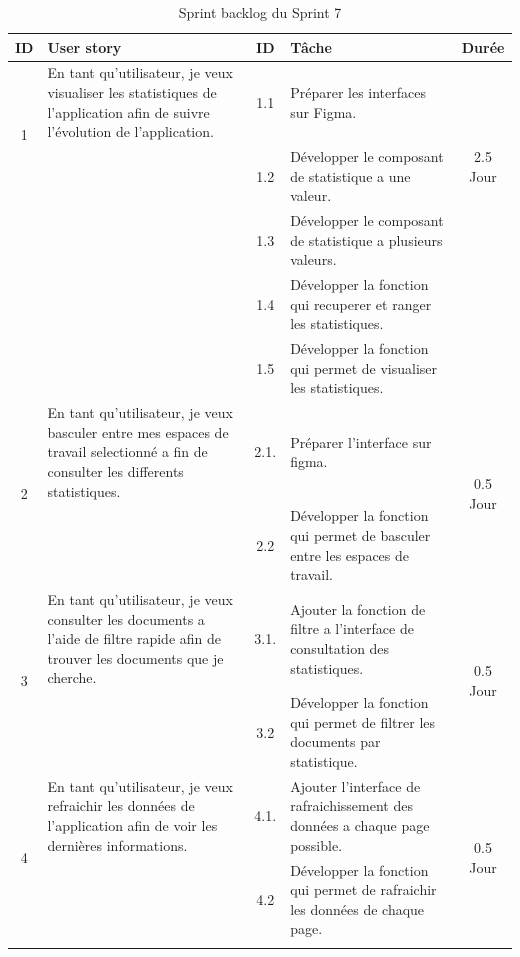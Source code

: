 \begin{adjustwidth}{-1cm}{}
    
    \begin{longtable}{|c|p{6cm}|c|p{6cm}|c|}
      \hline
      \textbf{ID} & \textbf{User story} & \textbf{ID}  & \textbf{Tâche} & \textbf{Durée} \\
      \hline
      \multirow{2}{*}{1} & En tant qu'utilisateur, je veux visualiser les statistiques de l'application afin de suivre l'évolution de l'application.
      & 1.1 & Préparer les interfaces sur Figma. & \multirow{3}{*}{2.5 Jour} \\
      \cline{3-4}
      & & 1.2 & Développer le composant de statistique a une valeur. & \\
      \cline{3-4}
      & & 1.3 & Développer le composant de statistique a plusieurs valeurs. & \\
      \cline{3-4}
      & & 1.4 & Développer la fonction qui recuperer et ranger les statistiques. & \\
      & & 1.5 & Développer la fonction qui permet de visualiser les statistiques. & \\
      \cline{1-5}

      \multirow{2}{*}{2} & En tant qu'utilisateur, je veux basculer entre mes espaces de travail selectionné a fin de consulter les differents statistiques. & 2.1.& Préparer l'interface sur figma. & \multirow{2}{*}{0.5 Jour} \\
      \cline{3-4}
      & &  2.2 & Développer la fonction qui permet de basculer entre les espaces de travail. & \\
      \cline{1-5}
      \multirow{2}{*}{3} & En tant qu'utilisateur, je veux consulter les documents a l'aide de filtre rapide afin de trouver les documents que je cherche. & 3.1.& Ajouter la fonction de filtre a l'interface de consultation des statistiques. & \multirow{2}{*}{0.5 Jour} \\
      \cline{3-4}
      & & 3.2 & Développer la fonction qui permet de filtrer les documents par statistique. & \\
      \cline{1-5}
      \multirow{2}{*}{4} & En tant qu'utilisateur, je veux refraichir les données de l'application afin de voir les dernières informations. & 4.1.& Ajouter l'interface de rafraichissement des données a chaque page possible. & \multirow{2}{*}{0.5 Jour} \\
      \cline{3-4}
      & & 4.2 & Développer la fonction qui permet de rafraichir les données de chaque page. & \\
      \cline{1-5}
  \hline
  \caption{Sprint backlog du Sprint 7}
  \label{tab:sprint-backlog-7}
\end{longtable}
\end{adjustwidth}


